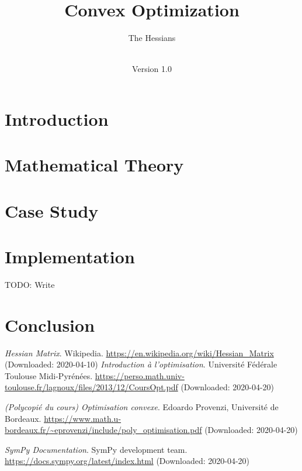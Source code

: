 \documentclass[notitlepage]{article}
\title{Convex Optimization\\}
\author{The Hessians}
\date{\documentdate\\Version 1.0} %
\begin{document}
\maketitle
\projectidentity
\authors

\newpage
\tableofcontents

\newpage
\listoffigures
{} 

\listoftables
{}

\newpage
{}

\section{Introduction}

\newpage

\section{Mathematical Theory}

\newpage

\section{Case Study}

\newpage

\section{Implementation}
TODO: Write
\newpage

\section{Conclusion}

\newpage

\begin{thebibliography}{9}

	\textit{Hessian Matrix}.
	Wikipedia.
	\url{https://en.wikipedia.org/wiki/Hessian_Matrix} (Downloaded: 2020-04-10)
    \textit{Introduction à l'optimisation}.
    Université Fédérale Toulouse Midi-Pyrénées.
    \url{https://perso.math.univ-toulouse.fr/lagnoux/files/2013/12/CoursOpt.pdf} (Downloaded: 2020-04-20)

    \textit{(Polycopié du cours) Optimisation convexe}.
    Edoardo Provenzi, Université de Bordeaux.
    \url{https://www.math.u-bordeaux.fr/~eprovenzi/include/poly_optimisation.pdf} (Downloaded: 2020-04-20)

    \textit{SymPy Documentation}.
    SymPy development team.
    \url{https://docs.sympy.org/latest/index.html} (Downloaded: 2020-04-20)

\end{thebibliography}
\end{document}
